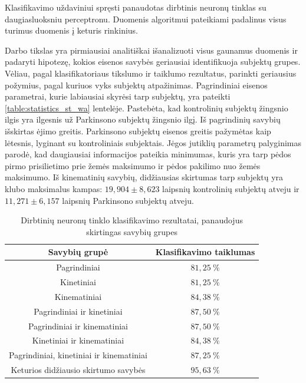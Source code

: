 \documentclass[]{vgtuef}
\begin{document}
Klasifikavimo uždaviniui spręsti panaudotas dirbtinis neuronų tinklas su daugiasluoksniu perceptronu. Duomenis algoritmui pateikiami padalinus visus turimus duomenis į keturis rinkinius.

Darbo tikslas yra pirmiausiai analitiškai išanalizuoti visus gaunamus duomenis ir padaryti hipotezę, kokios eisenos savybės geriausiai identifikuoja subjektų grupes. Vėliau, pagal klasifikatoriaus tikslumo ir taiklumo rezultatus, parinkti geriausius požymius, pagal kuriuos vyks subjektų atpažinimas. Pagrindiniai eisenos parametrai, kurie labiausiai skyrėsi tarp subjektų, yra pateikti \ref{table:statistics_st_wa} lentelėje. Pastebėta, kad kontrolinių subjektų žingsnio ilgis yra ilgesnis už Parkinsono subjektų žingsnio ilgį. Iš pagrindinių savybių išskirtas ėjimo greitis. Parkinsono subjektų eisenos greitis pažymėtas kaip lėtesnis, lyginant su kontroliniais subjektais. Jėgos jutiklių parametrų palyginimas parodė, kad daugiausiai informacijos pateikia minimumas, kuris yra tarp pėdos pirmo prisilietimo prie žemės maksimumo ir pėdos pakilimo nuo žemės maksimumo. Iš kinematinių savybių, didžiausias skirtumas tarp subjektų yra klubo maksimalus kampas: $19,904\pm8,623$ laipsnių kontrolinių subjektų atveju ir $11,271\pm6,157$ laipsnių Parkinsono subjektų atveju.

\begin{table}
	\centering
	\renewcommand{\arraystretch}{1.3}
	\caption{Dirbtinių neuronų tinklo klasifikavimo rezultatai, panaudojus skirtingas savybių grupes \cite{6151536}}
	\label{table:ann_table_results}
	\begin{tabular}{|c|c|} \hline
		Savybių grupė & Klasifikavimo taiklumas \\ \hline
		Pagrindiniai & $81,25~\%$ \\ \hline
		Kinetiniai & $81,25~\%$ \\ \hline
		Kinematiniai & $84,38~\%$ \\ \hline
		Pagrindiniai ir kinetiniai & $87,50~\%$ \\ \hline
		Pagrindiniai ir kinematiniai & $87,50~\%$ \\ \hline
		Kinetiniai ir kinematiniai & $84,38~\%$ \\ \hline
		Pagrindiniai, kinetiniai ir kinematiniai & $87,25~\%$ \\ \hline	
		Keturios didžiausio skirtumo savybės & $95,63~\%$ \\ \hline	
	\end{tabular}
\end{table}
\end{document}
